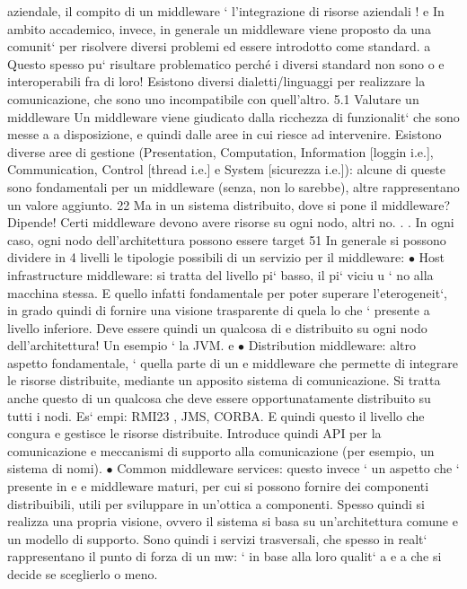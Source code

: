 \documentclass[a4paper,12pt]{article}
\begin{document}
aziendale, il compito di un middleware ` l'integrazione di risorse aziendali !
e
In ambito accademico, invece, in generale un middleware viene proposto da
una comunit` per risolvere diversi problemi ed essere introdotto come standard.
a
Questo spesso pu` risultare problematico perché i diversi standard non sono
o
e
interoperabili fra di loro! Esistono diversi dialetti/linguaggi per realizzare la
comunicazione, che sono uno incompatibile con quell'altro.
5.1
Valutare un middleware
Un middleware viene giudicato dalla ricchezza di funzionalit` che sono messe a
a
disposizione, e quindi dalle aree in cui riesce ad intervenire. Esistono diverse
aree di gestione (Presentation, Computation, Information [loggin i.e.], Communication, Control [thread i.e.] e System
[sicurezza i.e.]): alcune di queste sono
fondamentali per un middleware (senza, non lo sarebbe), altre rappresentano
un valore aggiunto.
22 Ma in un sistema distribuito, dove si pone il middleware? Dipende! Certi middleware
devono avere risorse su ogni nodo, altri no. . . In ogni caso, ogni nodo dell'architettura possono
essere target
51
\newpage
In generale si possono dividere in 4 livelli le tipologie possibili di un servizio
per il middleware:
$\bullet$ Host infrastructure middleware: si tratta del livello pi` basso, il pi` viciu
u
`
no alla macchina stessa. E quello infatti fondamentale per poter superare
l'eterogeneit`, in grado quindi di fornire una visione trasparente di quela
lo che ` presente a livello inferiore. Deve essere quindi un qualcosa di
e
distribuito su ogni nodo dell'architettura! Un esempio ` la JVM.
e
$\bullet$ Distribution middleware: altro aspetto fondamentale, ` quella parte di un
e
middleware che permette di integrare le risorse distribuite, mediante un
apposito sistema di comunicazione. Si tratta anche questo di un qualcosa che deve essere opportunatamente distribuito su
tutti i nodi. Es`
empi: RMI23 , JMS, CORBA. E quindi questo il livello che congura e
gestisce le risorse distribuite. Introduce quindi API per la comunicazione
e meccanismi di supporto alla comunicazione (per esempio, un sistema di
nomi).
$\bullet$ Common middleware services: questo invece ` un aspetto che ` presente in
e
e
middleware maturi, per cui si possono fornire dei componenti distribuibili,
utili per sviluppare in un'ottica a componenti. Spesso quindi si realizza
una propria visione, ovvero il sistema si basa su un'architettura comune
e un modello di supporto. Sono quindi i servizi trasversali, che spesso in
realt` rappresentano il punto di forza di un mw: ` in base alla loro qualit`
a
e
a
che si decide se sceglierlo o meno.
\end{document}
